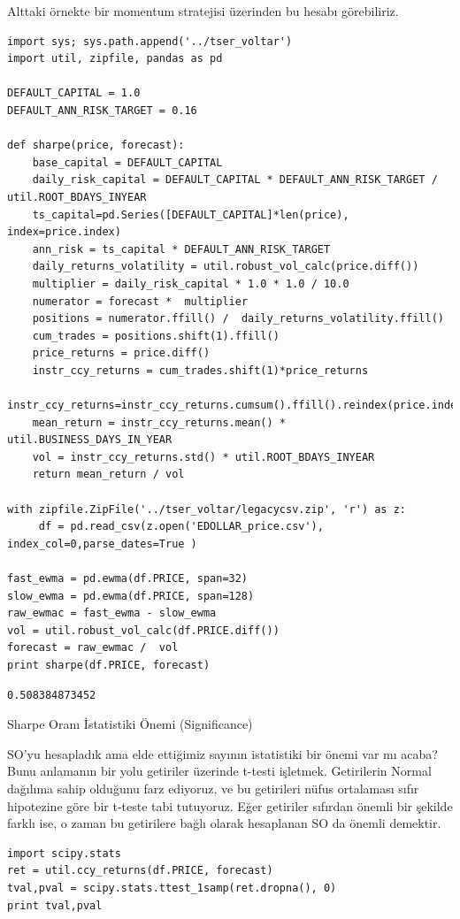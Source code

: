 \documentclass[12pt,fleqn]{article}\usepackage{../../common}
\begin{document}
Alttaki örnekte bir momentum stratejisi üzerinden bu hesabı görebiliriz. 

\begin{verbatim}  
import sys; sys.path.append('../tser_voltar')
import util, zipfile, pandas as pd

DEFAULT_CAPITAL = 1.0
DEFAULT_ANN_RISK_TARGET = 0.16

def sharpe(price, forecast):
    base_capital = DEFAULT_CAPITAL
    daily_risk_capital = DEFAULT_CAPITAL * DEFAULT_ANN_RISK_TARGET / util.ROOT_BDAYS_INYEAR 
    ts_capital=pd.Series([DEFAULT_CAPITAL]*len(price), index=price.index)        
    ann_risk = ts_capital * DEFAULT_ANN_RISK_TARGET
    daily_returns_volatility = util.robust_vol_calc(price.diff())
    multiplier = daily_risk_capital * 1.0 * 1.0 / 10.0
    numerator = forecast *  multiplier
    positions = numerator.ffill() /  daily_returns_volatility.ffill()
    cum_trades = positions.shift(1).ffill()
    price_returns = price.diff()
    instr_ccy_returns = cum_trades.shift(1)*price_returns 
    instr_ccy_returns=instr_ccy_returns.cumsum().ffill().reindex(price.index).diff()
    mean_return = instr_ccy_returns.mean() * util.BUSINESS_DAYS_IN_YEAR
    vol = instr_ccy_returns.std() * util.ROOT_BDAYS_INYEAR
    return mean_return / vol
      
with zipfile.ZipFile('../tser_voltar/legacycsv.zip', 'r') as z:
     df = pd.read_csv(z.open('EDOLLAR_price.csv'), index_col=0,parse_dates=True )

fast_ewma = pd.ewma(df.PRICE, span=32)
slow_ewma = pd.ewma(df.PRICE, span=128)
raw_ewmac = fast_ewma - slow_ewma
vol = util.robust_vol_calc(df.PRICE.diff())
forecast = raw_ewmac /  vol 
print sharpe(df.PRICE, forecast)
\end{verbatim}

\begin{verbatim}
0.508384873452
\end{verbatim}

Sharpe Oranı İstatistiki Önemi (Significance)

SO'yu hesapladık ama elde ettiğimiz sayının istatistiki bir önemi var mı acaba?
Bunu anlamanın bir yolu getiriler üzerinde t-testi işletmek. Getirilerin Normal
dağılıma sahip olduğunu farz ediyoruz, ve bu getirileri nüfus ortalaması sıfır
hipotezine göre bir t-teste tabi tutuyoruz. Eğer getiriler sıfırdan önemli bir
şekilde farklı ise, o zaman bu getirilere bağlı olarak hesaplanan SO da önemli
demektir. 

\begin{verbatim}
import scipy.stats
ret = util.ccy_returns(df.PRICE, forecast)
tval,pval = scipy.stats.ttest_1samp(ret.dropna(), 0)
print tval,pval
\end{verbatim}
\end{document}
